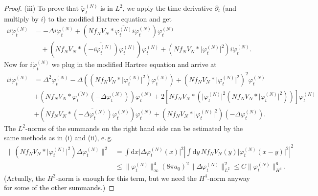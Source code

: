 \documentclass[11pt,a4paper]{scrartcl}
\newcommand{\di}{\textrm{d}}		%
\newcommand{\cc}[1]{\overline{#1}}	%
\newcommand{\norm}[1]{\lVert#1\rVert}	%
\newcommand{\ph}{\varphi_t^{(N)}}	%
\newcommand{\phdot}{\dot{\varphi}_t^{(N)}}	%
\newcommand{\phddot}{\ddot{\varphi}_t^{(N)}}	%
\begin{document}
\begin{proof}
(iii) To prove that $\phddot$ is in $L^2$, we apply the time derivative $\partial_t$ (and multiply by $i$) to the modified Hartree equation and get
\begin{align*}
ii\phddot & = - \Delta i \phdot + \left( N f_N V_N \ast \cc{\ph}i \phdot \right) \ph \\
& \quad + \left( N f_N V_N \ast \cc{(-i\phdot)} \ph \right) \ph + \left( N f_N V_N \ast \lvert\ph\rvert^2 \right) i\phdot.
\end{align*}
Now for $i\phdot$ we plug in the modified Hartree equation and arrive at
\begin{align*}
ii \phddot & = \Delta^2 \ph - \Delta \left( (N f_N V_N \ast \lvert \ph\rvert^2)\ph \right) + \left( N f_N V_N \ast \lvert \ph\rvert^2 \right)^2 \ph \\
& + (N f_N V_N \ast \cc{\ph}(-\Delta \ph))\ph + 2 \left[ N f_N V_N \ast \left( \lvert \ph\rvert^2 (N f_N V_N \ast \lvert \ph\rvert^2) \right) \right] \ph \\
& + (N f_N V_N \ast \cc{(-\Delta \ph)} \ph)\ph + \left( N f_N V_N \ast \lvert \ph \rvert^2 \right)(-\Delta \ph).
\end{align*}
The $L^2$-norms of the summands on the right hand side can be estimated by the same methods as in (i) and (ii), e.\,g.\ 
\begin{align*}
 \norm{\left( N f_N V_N \ast \lvert \ph\rvert^2 \right) \Delta \ph}^2 & = \int \di x \lvert \Delta \ph(x)\rvert^2 \left\lvert \int \di y\, N f_N V_N(y) \lvert \ph(x-y) \rvert^2 \right\rvert^2 \\
& \leq \norm{\ph}_\infty^4 (8 \pi a_0)^2 \norm{\Delta \ph}_{L^2}^2 \leq C \norm{\ph}_{H^4}^6.
\end{align*}
(Actually, the $H^2$-norm is enough for this term, but we need the $H^4$-norm anyway for some of the other summands.)
\end{proof}
\end{document}

